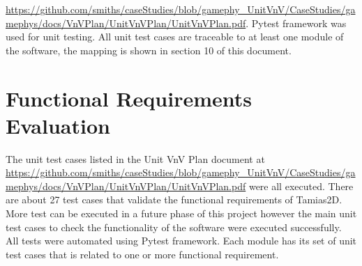 \documentclass[12pt, titlepage]{article}
\newcommand{\progname}{Tamias2D}
\begin{document}
\url{https://github.com/smiths/caseStudies/blob/gamephy_UnitVnV/CaseStudies/gamephys/docs/VnVPlan/UnitVnVPlan/UnitVnVPlan.pdf}. Pytest framework was used for unit testing. All unit test cases are traceable to at least one module of the software, the mapping is shown in section 10 of this document.


\section{Functional Requirements Evaluation}
The unit test cases listed in the Unit VnV Plan document at \url{https://github.com/smiths/caseStudies/blob/gamephy_UnitVnV/CaseStudies/gamephys/docs/VnVPlan/UnitVnVPlan/UnitVnVPlan.pdf} were all executed. There are about 27 test cases that validate the functional requirements of \progname . More test can be executed in a future phase of this project however the main unit test cases to check the functionality of the software were executed successfully. All tests were automated using Pytest framework. Each module has its set of unit test cases that is related to one or more functional requirement.
\end{document}

